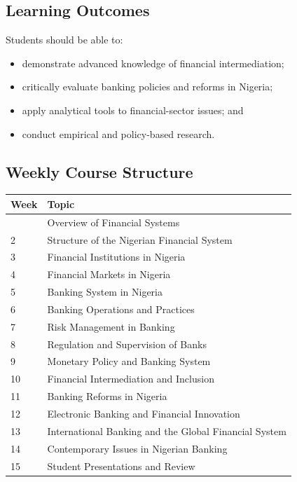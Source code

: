 \documentclass[
]{article}
\newcounter{none} %
\providecommand{\tightlist}{%
  \setlength{\itemsep}{0pt}\setlength{\parskip}{0pt}}
\begin{document}
\subsection{Learning Outcomes}\label{learning-outcomes}

Students should be able to:

\begin{itemize}
\tightlist
\item
  demonstrate advanced knowledge of financial intermediation;
\item
  critically evaluate banking policies and reforms in Nigeria;
\item
  apply analytical tools to financial-sector issues; and
\item
  conduct empirical and policy-based research.
\end{itemize}

\subsection{Weekly Course Structure}\label{weekly-course-structure}

{\def\LTcaptype{none} %
\begin{longtable}[]{@{}ll@{}}
\toprule\noalign{}
Week & Topic \\
\midrule\noalign{}
\endhead
\bottomrule\noalign{}
\endlastfoot
1 & Overview of Financial Systems \\
2 & Structure of the Nigerian Financial System \\
3 & Financial Institutions in Nigeria \\
4 & Financial Markets in Nigeria \\
5 & Banking System in Nigeria \\
6 & Banking Operations and Practices \\
7 & Risk Management in Banking \\
8 & Regulation and Supervision of Banks \\
9 & Monetary Policy and Banking System \\
10 & Financial Intermediation and Inclusion \\
11 & Banking Reforms in Nigeria \\
12 & Electronic Banking and Financial Innovation \\
13 & International Banking and the Global Financial System \\
14 & Contemporary Issues in Nigerian Banking \\
15 & Student Presentations and Review \\
\end{longtable}
}
\end{document}
